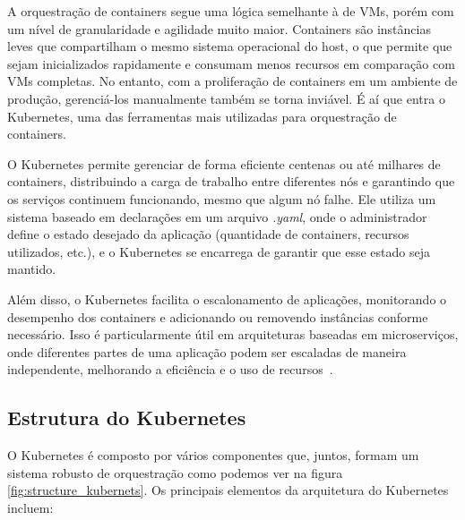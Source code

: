 A orquestração de containers segue uma lógica semelhante à de VMs, porém com um nível de granularidade e agilidade muito maior. Containers são instâncias leves que compartilham o mesmo sistema operacional do host, o que permite que sejam inicializados rapidamente e consumam menos recursos em comparação com VMs completas. No entanto, com a proliferação de containers em um ambiente de produção, gerenciá-los manualmente também se torna inviável. É aí que entra o Kubernetes, uma das ferramentas mais utilizadas para orquestração de containers.

O Kubernetes permite gerenciar de forma eficiente centenas ou até milhares de containers, distribuindo a carga de trabalho entre diferentes nós e garantindo que os serviços continuem funcionando, mesmo que algum nó falhe. Ele utiliza um sistema baseado em declarações em um arquivo \textit{.yaml}, onde o administrador define o estado desejado da aplicação (quantidade de containers, recursos utilizados, etc.), e o Kubernetes se encarrega de garantir que esse estado seja mantido.

Além disso, o Kubernetes facilita o escalonamento de aplicações, monitorando o desempenho dos containers e adicionando ou removendo instâncias conforme necessário. Isso é particularmente útil em arquiteturas baseadas em microserviços, onde diferentes partes de uma aplicação podem ser escaladas de maneira independente, melhorando a eficiência e o uso de recursos~\citep{KubernetsDocumentation}.

\subsection{Estrutura do Kubernetes}

O Kubernetes é composto por vários componentes que, juntos, formam um sistema robusto de orquestração como podemos ver na figura \ref{fig:structure_kubernets}. Os principais elementos da arquitetura do Kubernetes incluem:


